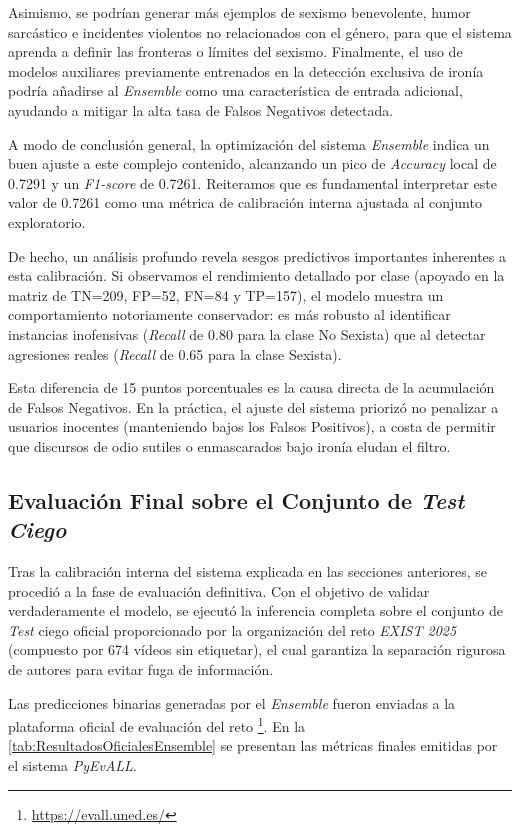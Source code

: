 Asimismo, se podrían generar más ejemplos de sexismo benevolente, humor sarcástico e incidentes violentos no relacionados con el género, para que el sistema aprenda a definir las fronteras o límites del sexismo. Finalmente, el uso de modelos auxiliares previamente entrenados en la detección exclusiva de ironía podría añadirse al \textit{Ensemble} como una característica de entrada adicional, ayudando a mitigar la alta tasa de Falsos Negativos detectada.

A modo de conclusión general, la optimización del sistema \textit{Ensemble} indica un buen ajuste a este complejo contenido, alcanzando un pico de \textit{Accuracy} local de 0.7291 y un \textit{F1-score} de 0.7261. Reiteramos que es fundamental interpretar este valor de 0.7261 como una métrica de calibración interna ajustada al conjunto exploratorio.  

De hecho, un análisis profundo revela sesgos predictivos importantes inherentes a esta calibración. Si observamos el rendimiento detallado por clase (apoyado en la matriz de TN=209, FP=52, FN=84 y TP=157), el modelo muestra un comportamiento notoriamente conservador: es más robusto al identificar instancias inofensivas (\textit{Recall} de 0.80 para la clase No Sexista) que al detectar agresiones reales (\textit{Recall} de 0.65 para la clase Sexista). 

Esta diferencia de 15 puntos porcentuales es la causa directa de la acumulación de Falsos Negativos. En la práctica, el ajuste del sistema priorizó no penalizar a usuarios inocentes (manteniendo bajos los Falsos Positivos), a costa de permitir que discursos de odio sutiles o enmascarados bajo ironía eludan el filtro. 

\subsection{Evaluación Final sobre el Conjunto de \textit{Test Ciego}}
\label{subsec:EvaluacionFinalTestCiego}
Tras la calibración interna del sistema explicada en las secciones anteriores, se procedió a la fase de evaluación definitiva. Con el objetivo de validar verdaderamente el modelo, se ejecutó la inferencia completa sobre el conjunto de \textit{Test} ciego oficial proporcionado por la organización del reto \textit{EXIST 2025} (compuesto por 674 vídeos sin etiquetar), el cual garantiza la separación rigurosa de autores para evitar fuga de información.

Las predicciones binarias generadas por el \textit{Ensemble} fueron enviadas a la plataforma oficial de evaluación del reto \footnote{\url{https://evall.uned.es/}}. En la \autoref{tab:ResultadosOficialesEnsemble} se presentan las métricas finales emitidas por el sistema \textit{PyEvALL}.


